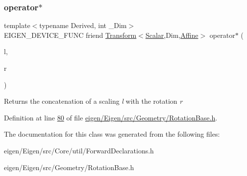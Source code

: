 \mbox{\label{class_eigen_1_1_rotation_base_a507ee9474b9d648cdc9d294f4e944d60}} 
\subsubsection{\texorpdfstring{operator$\ast$}{operator*}\hspace{0.1cm}{\footnotesize\ttfamily [4/4]}}
{\footnotesize\ttfamily template$<$typename Derived, int \+\_\+\+Dim$>$ \\
E\+I\+G\+E\+N\+\_\+\+D\+E\+V\+I\+C\+E\+\_\+\+F\+U\+NC friend \hyperlink{group___geometry___module_class_eigen_1_1_transform}{Transform}$<$\hyperlink{class_eigen_1_1_rotation_base_af9b43eac462d7aa70b018efd49c13ef4}{Scalar},Dim,\hyperlink{group__enums_ggaee59a86102f150923b0cac6d4ff05107a71e768e0581725d919d0b05f4cb83234}{Affine}$>$ operator$\ast$ (\begin{DoxyParamCaption}\item[{const \hyperlink{group___core___module_class_eigen_1_1_diagonal_matrix}{Diagonal\+Matrix}$<$ \hyperlink{class_eigen_1_1_rotation_base_af9b43eac462d7aa70b018efd49c13ef4}{Scalar}, Dim $>$ \&}]{l,  }\item[{const Derived \&}]{r }\end{DoxyParamCaption})\hspace{0.3cm}{\ttfamily [friend]}}

\begin{DoxyReturn}{Returns}
the concatenation of a scaling {\itshape l} with the rotation {\itshape r} 
\end{DoxyReturn}


Definition at line \hyperlink{eigen_2_eigen_2src_2_geometry_2_rotation_base_8h_source_l00080}{80} of file \hyperlink{eigen_2_eigen_2src_2_geometry_2_rotation_base_8h_source}{eigen/\+Eigen/src/\+Geometry/\+Rotation\+Base.\+h}.



The documentation for this class was generated from the following files\+:\begin{DoxyCompactItemize}
\item 
eigen/\+Eigen/src/\+Core/util/\+Forward\+Declarations.\+h\item 
eigen/\+Eigen/src/\+Geometry/\+Rotation\+Base.\+h\end{DoxyCompactItemize}
